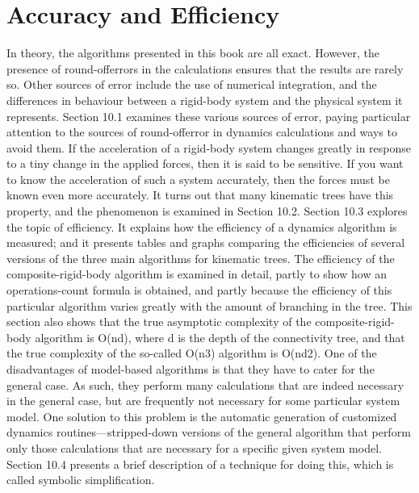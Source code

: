 \chapter{Accuracy and Efficiency}
\label{chap:10}
In theory, the algorithms presented in this book are all exact. However, the presence of round-offerrors in the calculations ensures that the results are rarely so. Other sources of error include the use of numerical integration, and the differences in behaviour between a rigid-body system and the physical system it represents. Section 10.1 examines these various sources of error, paying particular attention to the sources of round-offerror in dynamics calculations and ways to avoid them. If the acceleration of a rigid-body system changes greatly in response to a tiny change in the applied forces, then it is said to be sensitive. If you want to know the acceleration of such a system accurately, then the forces must be known even more accurately. It turns out that many kinematic trees have this property, and the phenomenon is examined in Section 10.2. Section 10.3 explores the topic of efficiency. It explains how the efficiency of a dynamics algorithm is measured; and it presents tables and graphs comparing the efficiencies of several versions of the three main algorithms for kinematic trees. The efficiency of the composite-rigid-body algorithm is examined in detail, partly to show how an operations-count formula is obtained, and partly because the efficiency of this particular algorithm varies greatly with the amount of branching in the tree. This section also shows that the true asymptotic complexity of the composite-rigid-body algorithm is O(nd), where d is the depth of the connectivity tree, and that the true complexity of the so-called O(n3) algorithm is O(nd2). One of the disadvantages of model-based algorithms is that they have to cater for the general case. As such, they perform many calculations that are indeed necessary in the general case, but are frequently not necessary for some particular system model. One solution to this problem is the automatic generation of customized dynamics routines—stripped-down versions of the general algorithm that perform only those calculations that are necessary for a specific given system model. Section 10.4 presents a brief description of a technique for doing this, which is called symbolic simplification.

